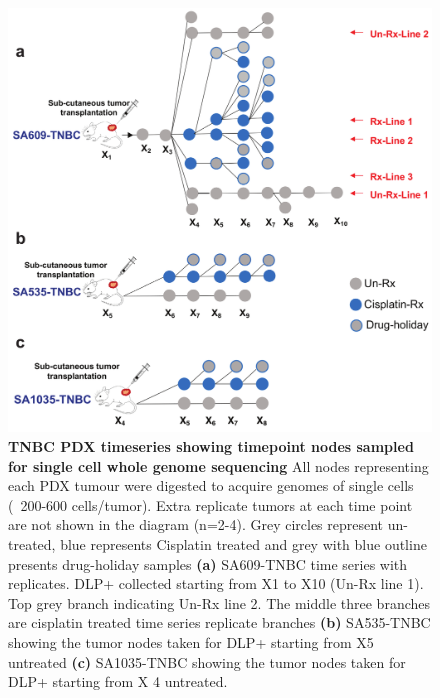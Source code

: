

\begin{figure}
\centering
\includegraphics[width=\textwidth]{Figures/chap4/treatedtimeseriesmanuscript.pdf}
  \caption[TNBC PDX timeseries clonal dynamics under drug perturbations]
	{\small
	\textbf{TNBC PDX timeseries showing timepoint nodes sampled for single cell whole genome sequencing}
	     All nodes representing each PDX tumour were digested to acquire genomes of single cells (~200-600 cells/tumor). Extra replicate tumors at each time point are not shown in the diagram (n=2-4). Grey circles represent un-treated, blue represents Cisplatin treated and grey with blue outline presents drug-holiday samples 
	     \textbf{(a)} SA609-TNBC time series with replicates. DLP+ collected starting from X1 to X10 (Un-Rx line 1). Top grey branch indicating Un-Rx line 2. The middle three branches are cisplatin treated time series replicate branches 
	     \textbf{(b)} SA535-TNBC  showing the tumor nodes taken for DLP+ starting from X5 untreated  \textbf{(c)} SA1035-TNBC  showing the tumor nodes taken for DLP+ starting from X 4 untreated.}
     \label{fig:treatedtimeseriesmanuscript}

\end{figure}


